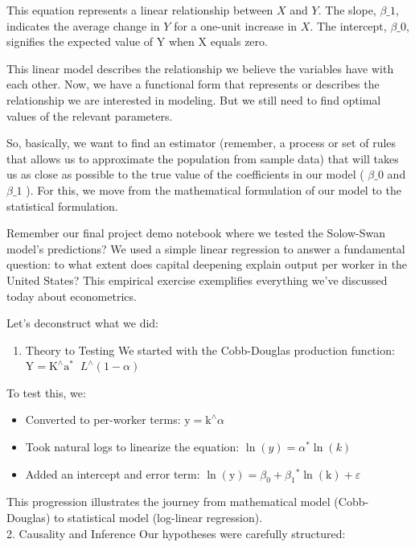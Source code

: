 \documentclass[10pt]{article}
\begin{document}
This equation represents a linear relationship between $X$ and $Y$. The slope, $\beta \_1$, indicates the average change in $Y$ for a one-unit increase in $X$. The intercept, $\beta \_0$, signifies the expected value of Y when X equals zero.

This linear model describes the relationship we believe the variables have with each other. Now, we have a functional form that represents or describes the relationship we are interested in modeling. But we still need to find optimal values of the relevant parameters.

So, basically, we want to find an estimator (remember, a process or set of rules that allows us to approximate the population from sample data) that will takes us as close as possible to the true value of the coefficients in our model ( $\beta \_0$ and $\beta \_1$ ). For this, we move from the mathematical formulation of our model to the statistical formulation.

Remember our final project demo notebook where we tested the Solow-Swan model's predictions? We used a simple linear regression to answer a fundamental question: to what extent does capital deepening explain output per worker in the United States? This empirical exercise exemplifies everything we've discussed today about econometrics.

Let's deconstruct what we did:

\begin{enumerate}
  \item Theory to Testing We started with the Cobb-Douglas production function: $\mathrm{Y}=\mathrm{K}^{\wedge} \mathrm{a}^{\text {* }}$ $L^{\wedge}(1-\alpha)$
\end{enumerate}

To test this, we:

\begin{itemize}
  \item Converted to per-worker terms: $\mathrm{y}=\mathrm{k}^{\wedge} \alpha$
  \item Took natural logs to linearize the equation: $\ln (y)=\alpha^{*} \ln (k)$
  \item Added an intercept and error term: $\ln (\mathrm{y})=\beta_{0}+\beta_{1}{ }^{*} \ln (\mathrm{k})+\varepsilon$
\end{itemize}

This progression illustrates the journey from mathematical model (Cobb-Douglas) to statistical model (log-linear regression).\\
2. Causality and Inference Our hypotheses were carefully structured:
\end{document}
